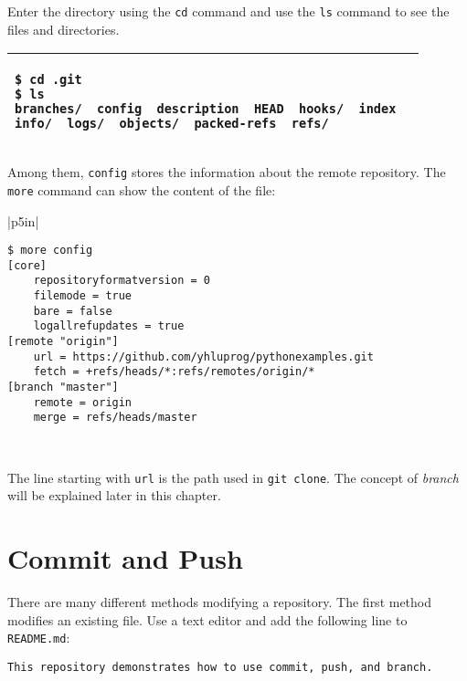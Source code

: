 Enter the directory using the {\tt cd} command
and use the {\tt ls} command to see the files and directories.

\vspace{0.2in}

\noindent
\begin{tabular}{|p{5in}|}\hline
\begin{verbatim}
$ cd .git
$ ls
branches/  config  description	HEAD  hooks/  index  
info/  logs/  objects/  packed-refs  refs/
\end{verbatim}
\\ \hline
\end{tabular}
\vspace{0.2in}


Among them, {\tt config} stores the information about
the remote repository.  The {\tt more} command can show
the content of the file:

\vspace{0.2in}

\noindent
\begin{tabular}{|p{5in}|}\hline
\begin{verbatim}
$ more config
[core]
	repositoryformatversion = 0
	filemode = true
	bare = false
	logallrefupdates = true
[remote "origin"]
	url = https://github.com/yhluprog/pythonexamples.git
	fetch = +refs/heads/*:refs/remotes/origin/*
[branch "master"]
	remote = origin
	merge = refs/heads/master
\end{verbatim}
\\ \hline
\end{tabular}
\vspace{0.2in}

The line starting with {\tt url} is the path used in {\tt git clone}.
The concept of {\it branch} will be explained later in this chapter.

\section{Commit and Push}


There are many different methods modifying a repository.  The first
method modifies an existing file.  Use a text editor and add the
following line to {\tt README.md}:

\begin{verbatim}
This repository demonstrates how to use commit, push, and branch.
\end{verbatim}

